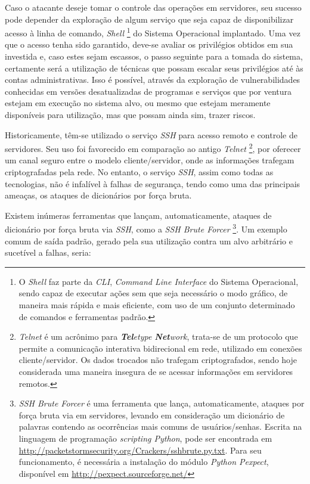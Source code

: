 Caso o atacante deseje tomar o controle das operações em servidores, seu sucesso pode depender da exploração de algum serviço que seja capaz de disponibilizar acesso à linha de comando, \textit{Shell} \footnote{O \textit{Shell} faz parte da \textit{CLI}, \textit{Command Line Interface} do Sistema Operacional, sendo capaz de executar ações sem que seja necessário o modo gráfico, de maneira mais rápida e mais eficiente, com uso de um conjunto determinado de comandos e ferramentas padrão.} do Sistema Operacional implantado. Uma vez que o acesso tenha sido garantido, deve-se avaliar os privilégios obtidos em sua investida e, caso estes sejam escassos, o passo seguinte para a tomada do sistema, certamente será a utilização de técnicas que possam escalar seus privilégios até às contas administrativas. Isso é possível, através da exploração de vulnerabilidades conhecidas em versões desatualizadas  de programas e serviços que por ventura estejam em execução no sistema alvo, ou mesmo que estejam meramente disponíveis para utilização, mas que possam ainda sim, trazer riscos. \cite{PrivilegeEscalation}

Historicamente, têm-se utilizado o serviço \textit{SSH} para acesso remoto e controle de servidores. Seu uso foi favorecido em comparação ao antigo \textit{Telnet} \footnote{\textit{Telnet} é um acrônimo para \textit{\textbf{Tel}etype \textbf{Net}work}, trata-se de um protocolo que permite a comunicação interativa bidirecional em rede, utilizado em conexões cliente/servidor. Os dados trocados não trafegam criptografados, sendo hoje considerada uma maneira insegura de se acessar informações em servidores remotos.}, por oferecer um canal seguro entre o modelo cliente/servidor, onde as informações trafegam criptografadas pela rede. No entanto, o serviço \textit{SSH}, assim como todas as tecnologias, não é infalível à falhas de segurança, tendo como uma das principais ameaças, os ataques de dicionários por força bruta.

Existem inúmeras ferramentas que lançam, automaticamente, ataques de dicionário por força bruta via \textit{SSH}, como a \textit{SSH Brute Forcer} \footnote{\textit{SSH Brute Forcer} é uma ferramenta que lança, automaticamente, ataques por força bruta via em servidores, levando em consideração um dicionário de palavras contendo as ocorrências mais comuns de usuários/senhas. Escrita na linguagem de programação \textit{scripting Python}, pode ser encontrada em \url{http://packetstormsecurity.org/Crackers/sshbrute.py.txt}. Para seu funcionamento, é necessária a instalação do módulo \textit{Python Pexpect}, disponível em \url{http://pexpect.sourceforge.net/}}. Um exemplo comum de saída padrão, gerado pela sua utilização contra um alvo arbitrário e sucetível a falhas, seria:

